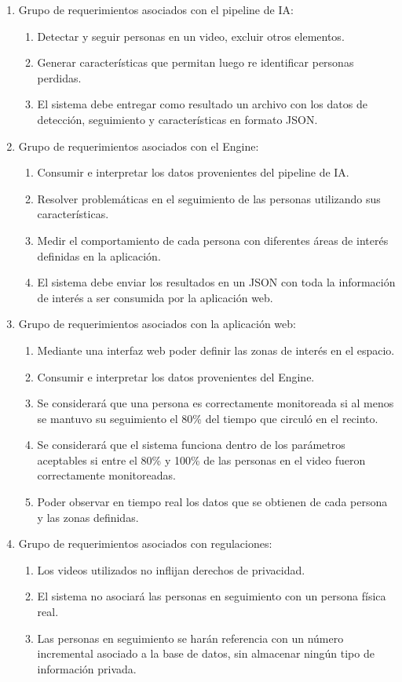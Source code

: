 \documentclass[11pt]{charter}
\begin{document}
\begin{enumerate}
\item Grupo de requerimientos asociados con el pipeline de IA:
	\begin{enumerate}
	\item Detectar y seguir personas en un video, excluir otros elementos.
	\item Generar características que permitan luego re identificar personas perdidas.
	\item El sistema debe entregar como resultado un archivo con los datos de detección, seguimiento y características en formato JSON.
	\end{enumerate}
\item Grupo de requerimientos asociados con el Engine:
	\begin{enumerate}
	\item Consumir e interpretar los datos provenientes del pipeline de IA.
	\item Resolver problemáticas en el seguimiento de las personas utilizando sus características.
	\item Medir el comportamiento de cada persona con diferentes áreas de interés definidas en la aplicación.
	\item El sistema debe enviar los resultados en un JSON con toda la información de interés a ser consumida por la aplicación web.
	\end{enumerate}
\item Grupo de requerimientos asociados con la aplicación web:
\begin{enumerate}
	\item Mediante una interfaz web poder definir las zonas de interés en el espacio.
	\item Consumir e interpretar los datos provenientes del Engine.
	\item Se considerará que una persona es correctamente monitoreada si al menos se mantuvo su seguimiento el 80\% del tiempo que circuló en el recinto.
	\item Se considerará que el sistema funciona dentro de los parámetros aceptables si entre el 80\% y 100\% de las personas en el video fueron correctamente monitoreadas.
	\item Poder observar en tiempo real los datos que se obtienen de cada persona y las zonas definidas.
	\end{enumerate}
\item Grupo de requerimientos asociados con regulaciones:
\begin{enumerate}
	\item Los videos utilizados no inflijan derechos de privacidad.
	\item El sistema no asociará las personas en seguimiento con un persona física real.
	\item Las personas en seguimiento se harán referencia con un número incremental asociado a la base de datos, sin almacenar ningún tipo de información privada.
	\end{enumerate}
\end{enumerate}
\end{document}

